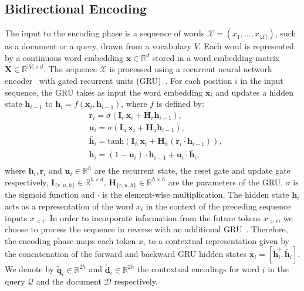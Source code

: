 \documentclass[11pt]{article}
\renewcommand{\b}[1]{\mathbf{#1}}
\begin{document}
\subsection{Bidirectional Encoding}
The input to the encoding phase is a sequence of words $\mathcal{X} =  (x_1, \ldots, x_{|\mathcal{X}|})$, such as a document or a query, drawn from a vocabulary $V$.
Each word is represented by a continuous word embedding $\mathbf{x} \in \mathbb{R}^d$ stored in a word embedding matrix $\mathbf{X} \in \mathbb{R}^{|V| \times d}$.
The sequence $\mathcal{X}$ is processed using a recurrent neural network encoder~\cite{bengio_book} with gated recurrent units (GRU)~\cite{GRU}. For each position $i$ in the input sequence, the GRU takes as input the word embedding $\mathbf{x}_i$ and updates a hidden state $\mathbf{h}_{i-1}$ to $\mathbf{h}_i = f(\mathbf{x}_i, \mathbf{h}_{i-1})$, where $f$ is defined by:
\begin{equation}
\label{eq:gru}
\begin{split}
& \b r_{i} = \sigma ( \b I_r\, \b x_i + \b H_r\b  h_{i-1}),\\
& \b u_{i} = \sigma ( \b I_u\, \b x_i + \b H_u\b  h_{i-1} ), \\
& \b{\bar h}_i = \text{tanh} (\b I_h\, \b x_i +\b  H_h (\b r_i \cdot \b h_{i-1})), \\
& \b h_i = (1 - \b u_i) \cdot \b h_{i-1} + \b u_i \cdot \b{\bar h}_i , \\
\end{split}
\end{equation}
where $\b h_i, \b r_i$ and $\b u_i \in \mathbb{R}^h$ are the recurrent state, the reset gate and update gate respectively, $\b I_{\{r,u,h\}} \in \mathbb{R}^{h \times d}$, $\b H_{\{r,u,h\}} \in \mathbb{R}^{h \times h}$ are the parameters of the GRU, $\sigma$ is the sigmoid function and $\cdot$ is the element-wise multiplication.
The hidden state $\mathbf{h}_i$ acts as a representation of the word $x_i$ in the context of the preceding sequence inputs $x_{<i}$. In order to incorporate information from the future tokens $x_{>i}$, we choose to process the sequence in reverse with an additional GRU~\cite{watson}.
Therefore, the encoding phase maps each token $x_i$ to a contextual representation given by the concatenation of the forward and backward GRU hidden states $\mathbf{\tilde{x}}_i = [\overrightarrow{\mathbf{h}_i}, \overleftarrow{\mathbf{h}_i}]$. We denote by $\mathbf{\tilde{q}}_i \in \mathbb{R}^{2h}$ and $\mathbf{\tilde{d}}_i \in \mathbb{R}^{2h}$ the contextual encodings for word $i$ in the query $\mathcal{Q}$ and the document $\mathcal{D}$ respectively.
\end{document}
